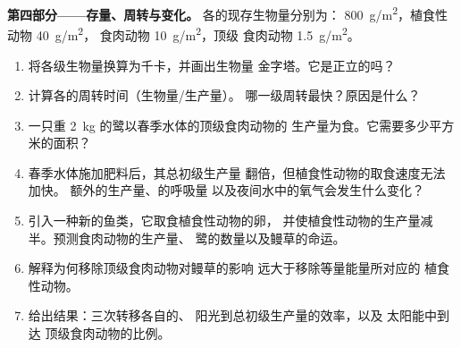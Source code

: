 \begin{problem}
\medskip
\noindent\textbf{第四部分——存量、周转与变化。}
各的现存生物量分别为： \qty{800}{g/m^2}，植食性动物 \qty{40}{g/m^2}，
食肉动物 \qty{10}{g/m^2}，顶级
食肉动物 \qty{1.5}{g/m^2}。
\begin{enumerate}[resume]
  \item 将各级生物量换算为千卡，并画出生物量
        金字塔。它是正立的吗？
  \item 计算各的周转时间（生物量/生产量）。
        哪一级周转最快？原因是什么？
  \item 一只重 \qty{2}{kg} 的鹭以春季水体的顶级食肉动物的
        生产量为食。它需要多少平方米的面积？
  \item 春季水体施加肥料后，其总初级生产量
        翻倍，但植食性动物的取食速度无法加快。
        额外的生产量、的呼吸量
        以及夜间水中的氧气会发生什么变化？
  \item 引入一种新的鱼类，它取食植食性动物的卵，
        并使植食性动物的生产量减半。预测食肉动物的生产量、
        鹭的数量以及鳗草的命运。
  \item 解释为何移除顶级食肉动物对鳗草的影响
        远大于移除等量能量所对应的
        植食性动物。
  \item 给出结果：三次转移各自的、
        阳光到总初级生产量的效率，以及
        太阳能中到达
        顶级食肉动物的比例。
\end{enumerate}
\end{problem}
